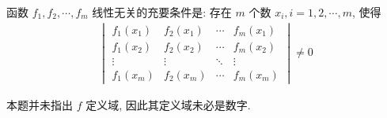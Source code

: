 \documentclass[../../main.tex]{subfiles}
\begin{document}
\begin{theorem}\label{theorem:函数线性无关的充要条件}
函数 \( f_1, f_2, \cdots, f_m \) 线性无关的充要条件是: 存在 \( m \) 个数 \( x_i, i = 1, 2, \cdots, m \), 使得
\begin{align}
\begin{vmatrix}
f_1(x_1) & f_2(x_1) & \cdots & f_m(x_1) \\
f_1(x_2) & f_2(x_2) & \cdots & f_m(x_2) \\
\vdots & \vdots & \ddots & \vdots \\
f_1(x_m) & f_2(x_m) & \cdots & f_m(x_m)
\end{vmatrix} \neq 0 \label{eq::::------89237878971249}
\end{align}
\end{theorem}
\begin{remark}
本题并未指出 \( f \) 定义域, 因此其定义域未必是数字.
\end{remark}
\end{document}
